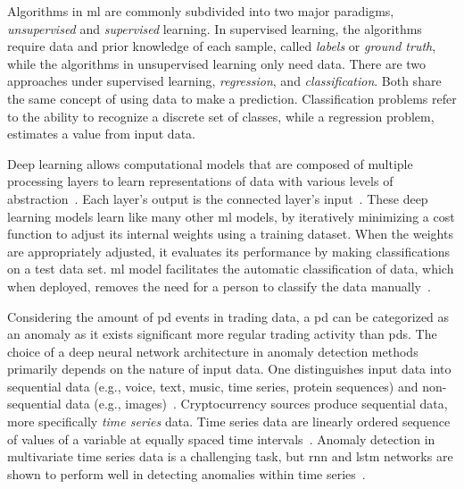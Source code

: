 Algorithms in \Ac{ml} are commonly subdivided into two major paradigms, \emph{unsupervised} and \emph{supervised} learning. In supervised learning, the algorithms require data and prior knowledge of each sample, called \emph{labels} or \emph{ground truth}, while the algorithms in unsupervised learning only need data. There are two approaches under supervised learning, \emph{regression}, and \emph{classification}. Both share the same concept of using data to make a prediction. Classification problems refer to the ability to recognize a discrete set of classes, while a regression problem, estimates a value from input data.

Deep learning allows computational models that are composed of multiple processing layers to learn representations of data with various levels of abstraction~\cite{lecun2015deep}. Each layer's output is the connected layer's input~\cite{mike_voets}. These deep learning models learn like many other \ac{ml} models, by iteratively minimizing a cost function to adjust its internal weights using a training dataset. When the weights are appropriately adjusted, it evaluates its performance by making classifications on a test data set. \ac{ml} model facilitates the automatic classification of data, which when deployed, removes the need for a person to classify the data manually~\cite{mike_voets}.

Considering the amount of \ac{pd} events in trading data, a \ac{pd} can be categorized as an anomaly as it exists significant more regular trading activity than \acp{pd}. The choice of a deep neural network architecture in anomaly detection methods primarily depends on the nature of input data. One distinguishes input data into sequential data (e.g., voice, text, music, time series, protein sequences) and non-sequential data (e.g., images)~\cite{dl_anomaly}. Cryptocurrency sources produce sequential data, more specifically \emph{time series} data. Time series data are linearly ordered sequence of values of a variable at equally spaced time intervals~\cite{stat_handbook}. Anomaly detection in multivariate time series data is a challenging task, but \ac{rnn} and \ac{lstm} networks are shown to perform well in detecting anomalies within time series~\cite{dl_anomaly}.


